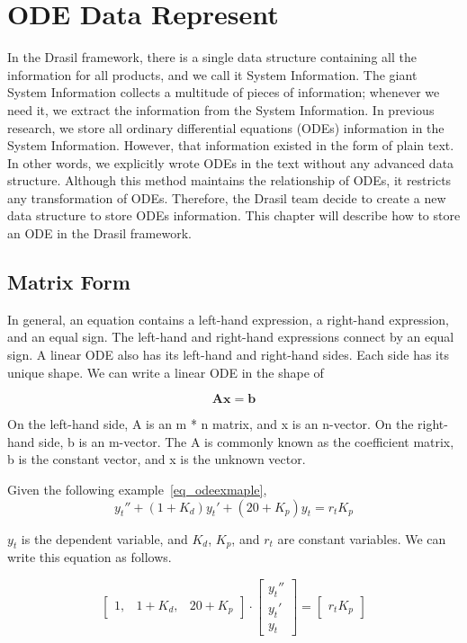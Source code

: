\chapter{ODE Data Represent}
In the Drasil framework, there is a single data structure containing all the information for all products, and we call it System Information. The giant System Information collects a multitude of pieces of information; whenever we need it, we extract the information from the System Information. In previous research, we store all ordinary differential equations (ODEs) information in the System Information. However, that information existed in the form of plain text. In other words, we explicitly wrote ODEs in the text without any advanced data structure. Although this method maintains the relationship of ODEs, it restricts any transformation of ODEs. Therefore, the Drasil team decide to create a new data structure to store ODEs information. This chapter will describe how to store an ODE in the Drasil framework. 

\section{Matrix Form}
In general, an equation contains a left-hand expression, a right-hand expression, and an equal sign. The left-hand and right-hand expressions connect by an equal sign. A linear ODE also has its left-hand and right-hand sides. Each side has its unique shape. We can write a linear ODE in the shape of

\begin{equation} \label{eq_matrixform}
	\boldsymbol{Ax} = \boldsymbol{b}
\end{equation}

On the left-hand side, A is an m * n matrix, and x is an n-vector. On the right-hand side, b is an m-vector. The A is commonly known as the coefficient matrix, b is the constant vector, and x is the unknown vector.

Given the following example~\ref{eq_odeexmaple},
\begin{equation} \label{eq_odeexmaple}
	y_t'' + (1 + K_d)y_t' + (20 + K_p)y_t = r_t K_p
\end{equation}

$y_t$ is the dependent variable, and $K_d$, $K_p$, and $r_t$ are constant variables. We can write this equation as follows. 

\begin{equation} \label{eq_matrixformexmaple}
	\begin{bmatrix}
		1, & 1 + K_{d}, & 20 + K_{p}
	\end{bmatrix}
	\cdot
	\begin{bmatrix}
		y_{t}''  \\
		y_{t}'   \\
		y_{t}  
	\end{bmatrix}
	=
	\begin{bmatrix}
		r_{t} K_{p} 
	\end{bmatrix}
\end{equation}

